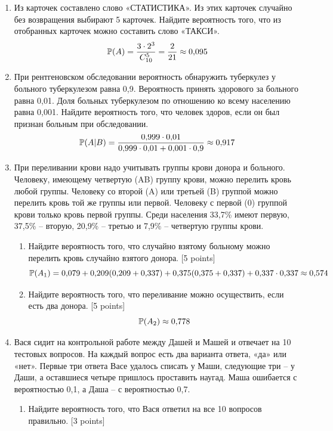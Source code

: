 \documentclass[12pt, a4paper]{article}\usepackage[]{graphicx}\usepackage[]{color}
\begin{document}
		\begin{enumerate}
			\item Из карточек составлено слово «СТАТИСТИКА». Из этих карточек случайно без возвращения  выбирают 5 карточек. Найдите вероятность того, что из отобранных карточек можно составить слово «ТАКСИ».
			\begin{equation}
			\P(A)=\frac{3\cdot 2^3}{C_{10}^{5}}=\frac{2}{21}\approx 0{,}095
			\end{equation}

			\item При рентгеновском обследовании вероятность обнаружить туберкулез у больного туберкулезом равна 0{,}9. Вероятность принять здорового за больного равна 0{,}01. Доля больных туберкулезом по отношению ко всему населению равна 0{,}001. Найдите вероятность того, что человек здоров, если он был признан больным при обследовании.
			\begin{equation}
			\P(A|B)=\frac{0{,}999\cdot 0{,}01}{0{,}999\cdot 0{,}01+0{,}001\cdot 0{,}9}\approx 0{,}917
			\end{equation}
			\item При переливании крови надо учитывать группы крови донора и больного. Человеку, имеющему четвертую (AB) группу крови, можно перелить кровь любой группы. Человеку со второй (A) или третьей (B) группой можно перелить кровь той же группы или первой. Человеку с первой (0) группой крови только кровь первой группы. Среди населения 33{,}7\% имеют первую, 37{,}5\% – вторую, 20{,}9\% -- третью и 7{,}9\% – четвертую группы крови.
			\begin{enumerate}
				\item Найдите вероятность того, что случайно взятому больному можно перелить кровь случайно взятого донора. [5 points]
				\begin{equation}
				\P(A_1)=0{,}079+0{,}209(0{,}209+0{,}337)+0{,}375(0{,}375+0{,}337)+0{,}337\cdot0{,}337\approx 0{,}574
				\end{equation}
				\item Найдите вероятность того, что переливание можно осуществить, если есть два донора. [5 points]
				\begin{equation}
				\P(A_2)\approx 0{,}778
				\end{equation}
			\end{enumerate}
			\item Вася сидит на контрольной работе между Дашей и Машей и отвечает на 10 тестовых вопросов. На каждый вопрос есть два варианта ответа, «да» или «нет». Первые три ответа Васе удалось списать у Маши, следующие три -- у Даши, а оставшиеся четыре пришлось проставить наугад. Маша ошибается с вероятностью 0{,}1, а Даша -- с вероятностью 0{,}7.
			\begin{enumerate}
				\item Найдите вероятность того, что Вася ответил на все 10 вопросов правильно. [3 points]


\end{enumerate}
\end{enumerate}
\end{document}
